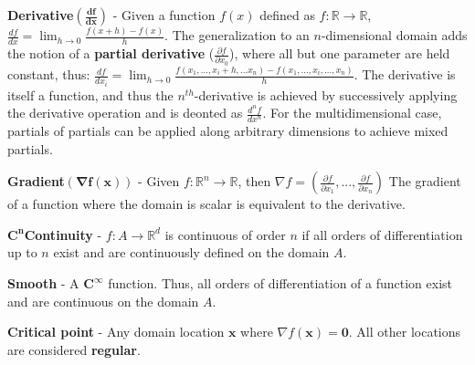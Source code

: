 \begin{defn}
\textbf{Derivative}$\mathbf{(\frac{df}{dx})}$ - Given a function $f(x)$ defined
 as $f : \mathbb{R} \rightarrow \mathbb{R}$,
 $\frac{df}{dx} = \lim_{h\rightarrow 0}\frac{f(x+h)-f(x)}{h}$.
 The generalization to an $n$-dimensional domain adds the notion of a
 \textbf{partial derivative} ($\frac{\partial f}{\partial x_0}$), where all but
 one parameter are held constant, thus: $\frac{df}{dx_i} =
 \lim_{h\rightarrow 0}\frac{f(x_1,...,x_i+h,...x_n)-f(x_1,...,x_i,...,x_n)}{h}$.
 The derivative is itself a function, and thus the $n^{th}$-derivative is
 achieved by successively applying the derivative operation and is deonted
 as $\frac{d^nf}{dx^n}$. For the multidimensional case, partials of partials can
 be applied along arbitrary dimensions to achieve mixed partials.
\end{defn}

\begin{defn}
  \textbf{Gradient}$\mathbf{(\nabla f(\mathbf{x}))}$ - Given $f : \mathbb{R}^n \rightarrow \mathbb{R}$, then $\nabla f = \left(\frac{\partial f}{\partial
  x_1},...,\frac{\partial f}{\partial x_{n}}\right)$
  The gradient of a function where the domain is scalar is equivalent to the
  derivative.
\end{defn}

\begin{defn}
  $\mathbf{C^n}$\textbf{Continuity} - $f : A \rightarrow \mathbb{R}^d$ is
  continuous of order $n$ if all orders of differentiation up to $n$ exist and
  are continuously defined on the domain $A$.
\end{defn}

\begin{defn}
  \textbf{Smooth} - A $\mathbf{C^\infty}$ function. Thus, all orders of
  differentiation of a function exist and are continuous on the domain $A$.
\end{defn}

\begin{defn}
  \textbf{Critical point} - Any domain location $\mathbf{x}$ where $\nabla
  f(\mathbf{x}) = \mathbf{0}$. All other locations are considered
  \textbf{regular}.
\end{defn}

